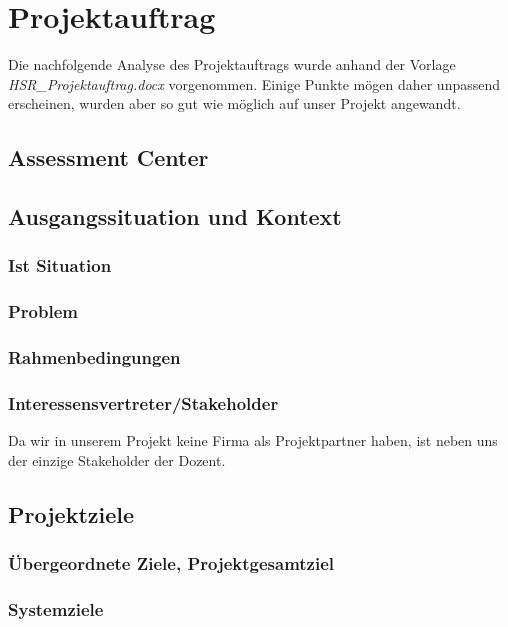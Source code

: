 \chapter{Projektauftrag}
Die nachfolgende Analyse des Projektauftrags wurde anhand der Vorlage \textit{HSR\_Projektauftrag.docx} vorgenommen. Einige Punkte mögen daher unpassend erscheinen, wurden aber so gut wie möglich auf unser Projekt angewandt.
\section*{Assessment Center}

\section{Ausgangssituation und Kontext}

\subsection{Ist Situation}

\subsection{Problem}

\subsection{Rahmenbedingungen}

\subsection{Interessensvertreter/Stakeholder}

Da wir in unserem Projekt keine Firma als Projektpartner haben, ist neben uns der einzige Stakeholder der Dozent. 

\section{Projektziele}

\subsection{Übergeordnete Ziele, Projektgesamtziel}

\subsection{Systemziele}

